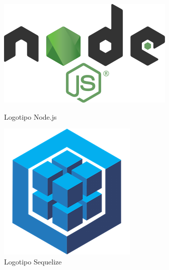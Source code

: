 \documentclass[11pt,spanish,listoffigures,listoftables]{tfgetsinf}
\begin{document}
\begin{figure}[!htb]
     \includegraphics[width=\linewidth]{img/Node.js_logo.png}
     \caption{Logotipo Node.js}\label{fig:LogoNode}
   \endminipage\hfill
     \includegraphics[width=\linewidth]{img/Sequelize_logo.png}
     \caption{Logotipo Sequelize}\label{fig:LogoSequelize}
   \endminipage

\end{figure}
\end{document}
